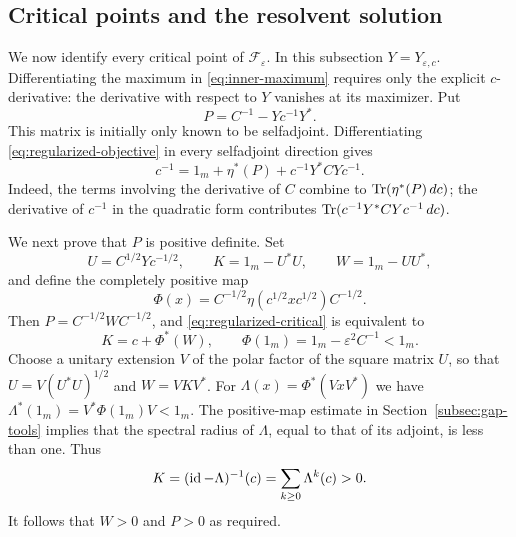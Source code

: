 \subsection{Critical points and the resolvent solution}
We now identify every critical point of $\mathcal F_\varepsilon$.
In this subsection $Y=Y_{\varepsilon,c}$.
Differentiating the maximum in \eqref{eq:inner-maximum} requires only the explicit $c$-derivative: the derivative with respect to $Y$ vanishes at its maximizer.
Put
\begin{equation}\label{eq:auxiliary-P}
 P=C^{-1}-Yc^{-1}Y^*.
\end{equation}
This matrix is initially only known to be selfadjoint.
Differentiating \eqref{eq:regularized-objective} in every selfadjoint direction gives
\begin{equation}\label{eq:regularized-critical}
 c^{-1}=1_m+\eta^*(P)+c^{-1}Y^*CYc^{-1}.
\end{equation}
Indeed, the terms involving the derivative of $C$ combine to $\operatorname{Tr}(\eta^*(P)\,dc)$; the derivative of $c^{-1}$ in the quadratic form contributes $\operatorname{Tr}(c^{-1}Y^*CYc^{-1}\,dc)$.

We next prove that $P$ is positive definite.
Set
\[
 U=C^{1/2}Yc^{-1/2},\qquad K=1_m-U^*U,\qquad W=1_m-UU^*,
\]
and define the completely positive map
\[
 \Phi(x)=C^{-1/2}\eta(c^{1/2}xc^{1/2})C^{-1/2}.
\]
Then $P=C^{-1/2}WC^{-1/2}$, and \eqref{eq:regularized-critical} is equivalent to
\begin{equation}\label{eq:sign-fixed-point}
 K=c+\Phi^*(W),\qquad
 \Phi(1_m)=1_m-\varepsilon^2C^{-1}<1_m.
\end{equation}
Choose a unitary extension $V$ of the polar factor of the square matrix $U$, so that $U=V(U^*U)^{1/2}$ and $W=VKV^*$.
For $\Lambda(x)=\Phi^*(VxV^*)$ we have $\Lambda^*(1_m)=V^*\Phi(1_m)V<1_m$.
The positive-map estimate in Section~\ref{subsec:gap-tools} implies that the spectral radius of $\Lambda$, equal to that of its adjoint, is less than one.
Thus
\[
 K=(\operatorname{id}-\Lambda)^{-1}(c)=\sum_{k\ge0}\Lambda^k(c)>0.
\]
It follows that $W>0$ and $P>0$ as required.

